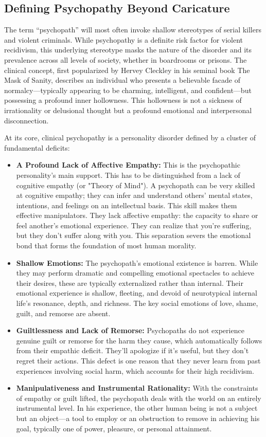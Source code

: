 \documentclass{article}
\begin{document}
\subsection{Defining Psychopathy Beyond Caricature}
The term “psychopath” will most often invoke shallow stereotypes of serial killers and violent criminals. While psychopathy is a definite risk factor for violent recidivism, this underlying stereotype masks the nature of the disorder and its prevalence across all levels of society, whether in boardrooms or prisons. The clinical concept, first popularized by Hervey Cleckley in his seminal book The Mask of Sanity, describes an individual who presents a believable facade of normalcy—typically appearing to be charming, intelligent, and confident—but possessing a profound inner hollowness. This hollowness is not a sickness of irrationality or delusional thought but a profound emotional and interpersonal disconnection.

At its core, clinical psychopathy is a personality disorder defined by a cluster of fundamental deficits:
\begin{itemize}
    \item \textbf{A Profound Lack of Affective Empathy:} This is the psychopathic personality's main support. This has to be distinguished from a lack of cognitive empathy (or "Theory of Mind"). A psychopath can be very skilled at cognitive empathy; they can infer and understand others' mental states, intentions, and feelings on an intellectual basis. This skill makes them effective manipulators. They lack affective empathy: the capacity to share or feel another's emotional experience. They can realize that you're suffering, but they don't suffer along with you. This separation severs the emotional bond that forms the foundation of most human morality.
    \item \textbf{Shallow Emotions:} The psychopath's emotional existence is barren. While they may perform dramatic and compelling emotional spectacles to achieve their desires, these are typically externalized rather than internal. Their emotional experience is shallow, fleeting, and devoid of neurotypical internal life's resonance, depth, and richness. The key social emotions of love, shame, guilt, and remorse are absent.
    \item \textbf{Guiltlessness and Lack of Remorse:} Psychopaths do not experience genuine guilt or remorse for the harm they cause, which automatically follows from their empathic deficit. They'll apologize if it's useful, but they don't regret their actions. This defect is one reason that they never learn from past experiences involving social harm, which accounts for their high recidivism.
    \item \textbf{Manipulativeness and Instrumental Rationality:} With the constraints of empathy or guilt lifted, the psychopath deals with the world on an entirely instrumental level. In his experience, the other human being is not a subject but an object—a tool to employ or an obstruction to remove in achieving his goal, typically one of power, pleasure, or personal attainment.
\end{itemize}
\end{document}
